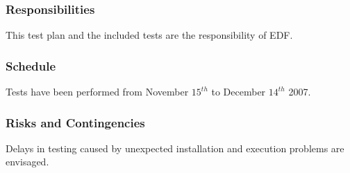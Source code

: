 \subsubsection{Responsibilities}

This test plan and the included tests are the
responsibility of EDF.


\subsubsection{Schedule}
Tests have been performed from November $15^{th}$ to December
$14^{th}$ 2007.

\subsubsection{Risks and Contingencies}

Delays in testing caused by unexpected installation and
execution problems are envisaged.%
